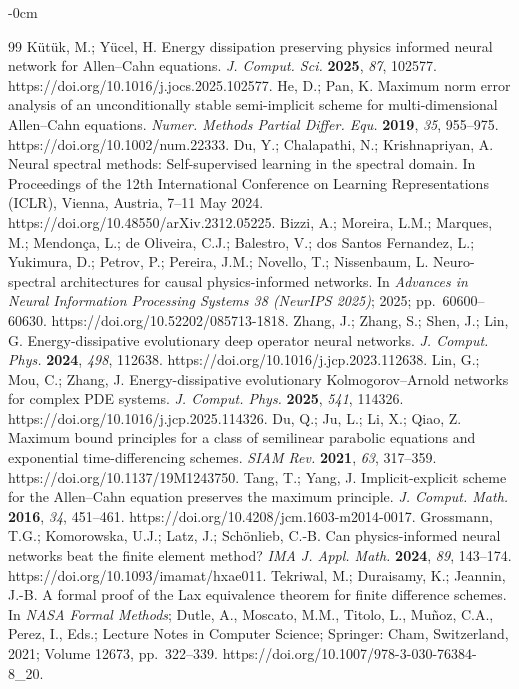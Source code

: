 \begin{adjustwidth}{-\extralength}{0cm}
\begin{thebibliography}{99}
 K\"ut\"uk, M.; Y\"ucel, H. Energy dissipation preserving physics informed neural network for Allen--Cahn equations. \textit{J. Comput. Sci.} \textbf{2025}, \textit{87}, 102577. https://doi.org/10.1016/j.jocs.2025.102577.
 He, D.; Pan, K. Maximum norm error analysis of an unconditionally stable semi-implicit scheme for multi-dimensional Allen--Cahn equations. \textit{Numer. Methods Partial Differ. Equ.} \textbf{2019}, \textit{35}, 955--975. https://doi.org/10.1002/num.22333.
 Du, Y.; Chalapathi, N.; Krishnapriyan, A. Neural spectral methods: Self-supervised learning in the spectral domain. In Proceedings of the 12th International Conference on Learning Representations (ICLR), Vienna, Austria, 7--11 May 2024. https://doi.org/10.48550/arXiv.2312.05225.
 Bizzi, A.; Moreira, L.M.; Marques, M.; Mendon\c{c}a, L.; de Oliveira, C.J.; Balestro, V.; dos Santos Fernandez, L.; Yukimura, D.; Petrov, P.; Pereira, J.M.; Novello, T.; Nissenbaum, L. Neuro-spectral architectures for causal physics-informed networks. In \textit{Advances in Neural Information Processing Systems 38 (NeurIPS 2025)}; 2025; pp.\ 60600--60630. https://doi.org/10.52202/085713-1818.
 Zhang, J.; Zhang, S.; Shen, J.; Lin, G. Energy-dissipative evolutionary deep operator neural networks. \textit{J. Comput. Phys.} \textbf{2024}, \textit{498}, 112638. https://doi.org/10.1016/j.jcp.2023.112638.
 Lin, G.; Mou, C.; Zhang, J. Energy-dissipative evolutionary Kolmogorov--Arnold networks for complex PDE systems. \textit{J. Comput. Phys.} \textbf{2025}, \textit{541}, 114326. https://doi.org/10.1016/j.jcp.2025.114326.
 Du, Q.; Ju, L.; Li, X.; Qiao, Z. Maximum bound principles for a class of semilinear parabolic equations and exponential time-differencing schemes. \textit{SIAM Rev.} \textbf{2021}, \textit{63}, 317--359. https://doi.org/10.1137/19M1243750.
 Tang, T.; Yang, J. Implicit-explicit scheme for the Allen--Cahn equation preserves the maximum principle. \textit{J. Comput. Math.} \textbf{2016}, \textit{34}, 451--461. https://doi.org/10.4208/jcm.1603-m2014-0017.
 Grossmann, T.G.; Komorowska, U.J.; Latz, J.; Sch\"onlieb, C.-B. Can physics-informed neural networks beat the finite element method? \textit{IMA J. Appl. Math.} \textbf{2024}, \textit{89}, 143--174. https://doi.org/10.1093/imamat/hxae011.
 Tekriwal, M.; Duraisamy, K.; Jeannin, J.-B. A formal proof of the Lax equivalence theorem for finite difference schemes. In \textit{NASA Formal Methods}; Dutle, A., Moscato, M.M., Titolo, L., Mu\~noz, C.A., Perez, I., Eds.; Lecture Notes in Computer Science; Springer: Cham, Switzerland, 2021; Volume 12673, pp.\ 322--339. https://doi.org/10.1007/978-3-030-76384-8\_20.

\end{thebibliography}
\end{adjustwidth}
